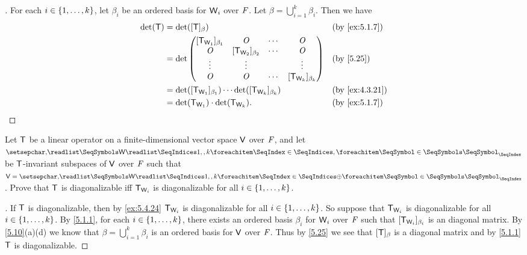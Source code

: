 \begin{proof}[]
	For each \(i \in \left\lbrace1, \dots, k\right\rbrace\), let \(\beta_i\) be an ordered basis for \(\mathsf{W}_i\) over \(\mathit{F}\).
	Let \(\beta = \bigcup_{i = 1}^k \beta_i\).
	Then we have
	\begin{align*}
		\det(\T) & = \det([\T]_{\beta})                                                                            &  & \by{ex:5.1.7}  \\
		         & = \det\begin{pmatrix}
			                 [\T_{\W_1}]_{\beta_1} & \zm                   & \cdots & \zm                   \\
			                 \zm                   & [\T_{\W_2}]_{\beta_2} & \cdots & \zm                   \\
			                 \vdots                & \vdots                &        & \vdots                \\
			                 \zm                   & \zm                   & \cdots & [\T_{\W_k}]_{\beta_k}
		                 \end{pmatrix} &  & \by{5.25}                  \\
		         & = \det([\T_{\W_1}]_{\beta_1}) \cdots \det([\T_{\W_k}]_{\beta_k})                                &  & \by{ex:4.3.21} \\
		         & = \det(\T_{\W_1}) \cdot \det(\T_{\W_k}).                                                        &  & \by{ex:5.1.7}
	\end{align*}
\end{proof}

\begin{ex}\label{ex:5.4.38}
	Let \(\mathsf{T}\) be a linear operator on a finite-dimensional vector space \(\mathsf{V}\) over \(\mathit{F}\), and let \(\seq{\W}{1,,k}\) be \(\mathsf{T}\)-invariant subspaces of \(\mathsf{V}\) over \(\mathit{F}\) such that \(\V = \seq[\oplus]{\W}{1,,k}\).
	Prove that \(\mathsf{T}\) is diagonalizable iff \(\mathsf{T}_{\mathsf{W}_i}\) is diagonalizable for all \(i \in \left\lbrace1, \dots, k\right\rbrace\).
\end{ex}

\begin{proof}[]
	If \(\mathsf{T}\) is diagonalizable, then by \cref{ex:5.4.24} \(\mathsf{T}_{\mathsf{W}_i}\) is diagonalizable for all \(i \in \left\lbrace1, \dots, k\right\rbrace\).
	So suppose that \(\mathsf{T}_{\mathsf{W}_i}\) is diagonalizable for all \(i \in \left\lbrace1, \dots, k\right\rbrace\).
	By \cref{5.1.1}, for each \(i \in \left\lbrace1, \dots, k\right\rbrace\), there exists an ordered basis \(\beta_i\) for \(\mathsf{W}_i\) over \(\mathit{F}\) such that \([\mathsf{T}_{\mathsf{W}_i}]_{\beta_i}\) is an diagonal matrix.
	By \cref{5.10}(a)(d) we know that \(\beta = \bigcup_{i = 1}^k \beta_i\) is an ordered basis for \(\mathsf{V}\) over \(\mathit{F}\).
	Thus by \cref{5.25} we see that \([\mathsf{T}]_{\beta}\) is a diagonal matrix and by \cref{5.1.1} \(\mathsf{T}\) is diagonalizable.
\end{proof}


